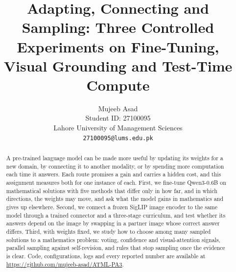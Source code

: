 \documentclass{article}
\title{Adapting, Connecting and Sampling: Three Controlled Experiments on Fine-Tuning, Visual Grounding and Test-Time Compute}
\author{%
  Mujeeb Asad \\
  Student ID: 27100095 \\
  Lahore University of Management Sciences \\
  \texttt{27100095@lums.edu.pk}
}
\begin{document}
\maketitle

\begin{abstract}
A pre-trained language model can be made more useful by updating its weights for a new domain, by connecting it to another modality, or by spending more computation each time it answers. Each route promises a gain and carries a hidden cost, and this assignment measures both for one instance of each. First, we fine-tune Qwen3-0.6B on mathematical solutions with five methods that differ only in how far, and in which directions, the weights may move, and ask what the model gains in mathematics and gives up elsewhere. Second, we connect a frozen SigLIP image encoder to the same model through a trained connector and a three-stage curriculum, and test whether its answers depend on the image by swapping in a partner image whose correct answer differs. Third, with weights fixed, we study how to choose among many sampled solutions to a mathematics problem: voting, confidence and visual-attention signals, parallel sampling against self-revision, and rules that stop sampling once the evidence is clear. Code, configurations, logs and every reported number are available at \url{https://github.com/mujeeb-asad/ATML-PA3}.
\end{abstract}









{\small }


\end{document}
